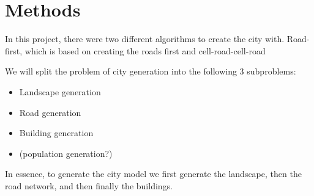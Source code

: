 \section{Methods}
In this project, there were two different algorithms to create the city with.
Road-first, which is based on creating the roads first and cell-road-cell-road 

We will split the problem of city generation into the following 3 subproblems:
\begin{itemize}
  \item Landscape generation
  \item Road generation
  \item Building generation
  \item (population generation?)
\end{itemize}

In essence, to generate the city model we first generate the landscape, then the road network, and then finally the buildings. 




